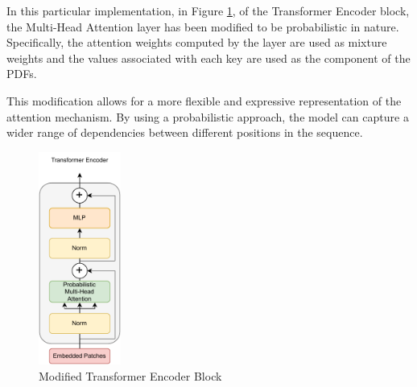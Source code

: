 In this particular implementation, in Figure \ref{fig:TransformereNCODER}, of the Transformer Encoder block, the Multi-Head Attention layer has been modified to be probabilistic in nature. Specifically, the attention weights computed by the layer are used as mixture weights and the values associated with each key are used as the component of the PDFs.

This modification allows for a more flexible and expressive representation of the attention mechanism. By using a probabilistic approach, the model can capture a wider range of dependencies between different positions in the sequence.
    \begin{figure}[htp]
        \centering
        \includegraphics[height=7cm]{images/Transformer Encoder.drawio.pdf}
        \caption{Modified Transformer Encoder Block}
        \label{fig:TransformereNCODER}
    \end{figure}
